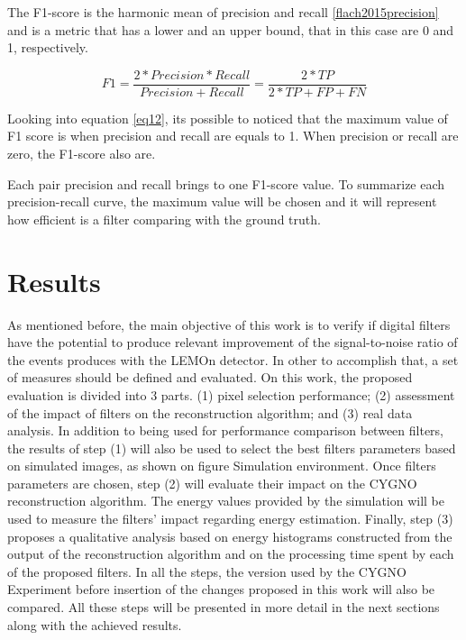 \documentclass[
        oneside,      %
        english,			
        brazil			 
        ]{abntbibufjf}
\begin{document}
The F1-score is the harmonic mean of precision and recall \ref{flach2015precision} and is a metric that has a lower and an upper bound, that in this case are 0 and 1, respectively.


\begin{equation}
    F1 = \frac{2*Precision*Recall}{Precision+Recall} = \frac{2*TP}{2*TP+FP+FN}
    \label{eq12}
\end{equation}

Looking into equation \ref{eq12}, its possible to noticed that the maximum value of F1 score is when precision and recall are equals to 1. When precision or recall are zero, the F1-score also are.

Each pair precision and recall brings to one F1-score value. To summarize each precision-recall curve, the maximum value will be chosen and it will represent how efficient is a filter comparing with the ground truth.



\chapter{Results}
\label{chap:result}


As mentioned before, the main objective of this work is to verify if digital filters have the potential to produce relevant improvement of the signal-to-noise ratio of the events produces with the LEMOn detector.
In other to accomplish that, a set of measures should be defined and evaluated. On this work, the proposed evaluation is divided into 3 parts. (1) pixel selection performance; (2) assessment of the impact of filters on the reconstruction algorithm; and (3) real data analysis.
In addition to being used for performance comparison between filters, the results of step (1) will also be used to select the best filters parameters based on simulated images, as shown on figure Simulation environment. 
Once filters parameters are chosen, step (2) will evaluate their impact on the CYGNO reconstruction algorithm. The energy values provided by the simulation will be used to measure the filters' impact regarding energy estimation.
Finally, step (3) proposes a qualitative analysis based on energy histograms constructed from the output of the reconstruction algorithm and on the processing time spent by each of the proposed filters.
In all the steps, the version used by the CYGNO Experiment before insertion of the changes proposed in this work will also be compared.
All these steps will be presented in more detail in the next sections along with the achieved results.
\end{document}
